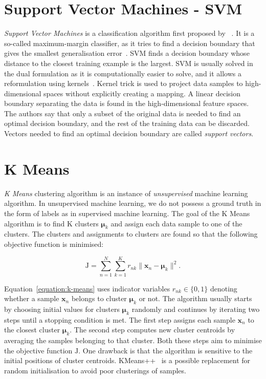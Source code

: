 \section{Support Vector Machines - SVM}
\label{section:svm}

\emph{Support Vector Machines} is a classification algorithm first proposed by
\citeauthor{svm}~\cite{svm}. It is a so-called maximum-margin classifier, as it tries to find a
decision boundary that gives the smallest generalisation error~\cite{pattern-recognition}. SVM
finds a decision boundary whose distance to the closest training example is the largest. SVM is
usually solved in the dual formulation as it is computationally easier to solve, and it allows a
reformulation using kernels~\cite{pattern-recognition}. Kernel trick is used to project data
samples to high-dimensional spaces without explicitly creating a mapping. A linear decision
boundary separating the data is found in the high-dimensional feature spaces. The authors say that
only a subset of the original data is needed to find an optimal decision boundary, and the rest of
the training data can be discarded. Vectors needed to find an optimal decision boundary are called
\emph{support vectors}.


\section{K Means}
\label{section:kmeans}

\emph{K Means} clustering algorithm is an instance of \emph{unsupervised} machine learning
algorithm. In unsupervised machine learning, we do not possess a ground truth in the form of labels
as in supervised machine learning. The goal of the K Means algorithm is to find $\mathrm{K}$
clusters $\boldsymbol{\mu}_k$ and assign each data sample to one of the clusters. The clusters and
assignments to clusters are found so that the following objective function is minimised:

\begin{equation}
    \mathrm{J} = \sum_{n=1}^N \sum_{k=1}^K r_{nk} \lVert \mathbf{x}_n - \boldsymbol{\mu}_k
    \rVert^2.
    \label{equation:k-means}
\end{equation}

Equation~\ref{equation:k-means} uses indicator variables $r_{nk} \in \{0, 1\}$ denoting whether a
sample $\mathbf{x}_n$ belongs to cluster $\boldsymbol{\mu}_k$ or not. The algorithm usually starts
by choosing initial values for clusters $\boldsymbol{\mu}_k$ randomly and continues by iterating
two steps until a stopping condition is met. The first step assigns each sample $\mathbf{x}_n$ to
the closest cluster $\boldsymbol{\mu}_k$. The second step computes new cluster centroids by
averaging the samples belonging to that cluster. Both these steps aim to minimise the objective
function $\mathrm{J}$. One drawback is that the algorithm is sensitive to the initial positions of
cluster centroids. KMeans++~\cite{kmeans++} is a possible replacement for random initialisation to
avoid poor clusterings of samples.


